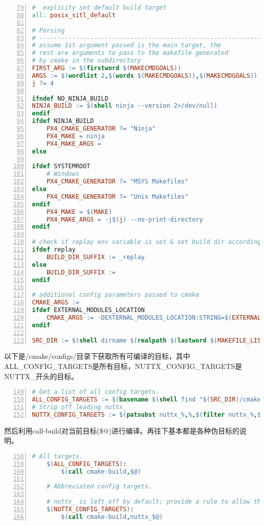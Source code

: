\begin{lstlisting}[language=make,numbers=left,firstnumber = 79,numberstyle=\tiny,breaklines = true,keywordstyle=\color{blue!70},commentstyle=\color{red!50!green!50!blue!50},frame=shadowbox, rulesepcolor=\color{red!20!green!20!blue!20}]
#  explicity set default build target
all: posix_sitl_default

# Parsing
# --------------------------------------------------------------------
# assume 1st argument passed is the main target, the
# rest are arguments to pass to the makefile generated
# by cmake in the subdirectory
FIRST_ARG := $(firstword $(MAKECMDGOALS))
ARGS := $(wordlist 2,$(words $(MAKECMDGOALS)),$(MAKECMDGOALS))
j ?= 4

ifndef NO_NINJA_BUILD
NINJA_BUILD := $(shell ninja --version 2>/dev/null)
endif
ifdef NINJA_BUILD
    PX4_CMAKE_GENERATOR ?= "Ninja"
    PX4_MAKE = ninja
    PX4_MAKE_ARGS =
else

ifdef SYSTEMROOT
	# Windows
	PX4_CMAKE_GENERATOR ?= "MSYS Makefiles"
else
	PX4_CMAKE_GENERATOR ?= "Unix Makefiles"
endif
    PX4_MAKE = $(MAKE)
    PX4_MAKE_ARGS = -j$(j) --no-print-directory
endif

# check if replay env variable is set & set build dir accordingly
ifdef replay
	BUILD_DIR_SUFFIX := _replay
else
	BUILD_DIR_SUFFIX :=
endif

# additional config parameters passed to cmake
CMAKE_ARGS :=
ifdef EXTERNAL_MODULES_LOCATION
	CMAKE_ARGS := -DEXTERNAL_MODULES_LOCATION:STRING=$(EXTERNAL_MODULES_LOCATION)
endif

SRC_DIR := $(shell dirname $(realpath $(lastword $(MAKEFILE_LIST))))
\end{lstlisting}

以下是/cmake/configs/目录下获取所有可编译的目标，其中ALL_CONFIG_TARGETS是所有目标，NUTTX_CONFIG_TARGETS是NUTTX_开头的目标。
\begin{lstlisting}[language=make,numbers=left,firstnumber = 149,numberstyle=\tiny,breaklines = true,keywordstyle=\color{blue!70},commentstyle=\color{red!50!green!50!blue!50},frame=shadowbox, rulesepcolor=\color{red!20!green!20!blue!20}]
# Get a list of all config targets.
ALL_CONFIG_TARGETS := $(basename $(shell find "$(SRC_DIR)/cmake/configs" ! -name '*_common*' ! -name '*_sdflight_*' -name '*.cmake' -print | sed  -e 's:^.*/::' | sort))
# Strip off leading nuttx_
NUTTX_CONFIG_TARGETS := $(patsubst nuttx_%,%,$(filter nuttx_%,$(ALL_CONFIG_TARGETS)))
\end{lstlisting}

然后利用call-build对当前目标(\$@)进行编译。再往下基本都是各种伪目标的说明。
\begin{lstlisting}[language=make,numbers=left,firstnumber = 158,numberstyle=\tiny,breaklines = true,keywordstyle=\color{blue!70},commentstyle=\color{red!50!green!50!blue!50},frame=shadowbox, rulesepcolor=\color{red!20!green!20!blue!20}]
	# All targets.
	$(ALL_CONFIG_TARGETS):
		$(call cmake-build,$@)
	
	# Abbreviated config targets.
	
	# nuttx_ is left off by default; provide a rule to allow that.
	$(NUTTX_CONFIG_TARGETS):
		$(call cmake-build,nuttx_$@)
\end{lstlisting}

